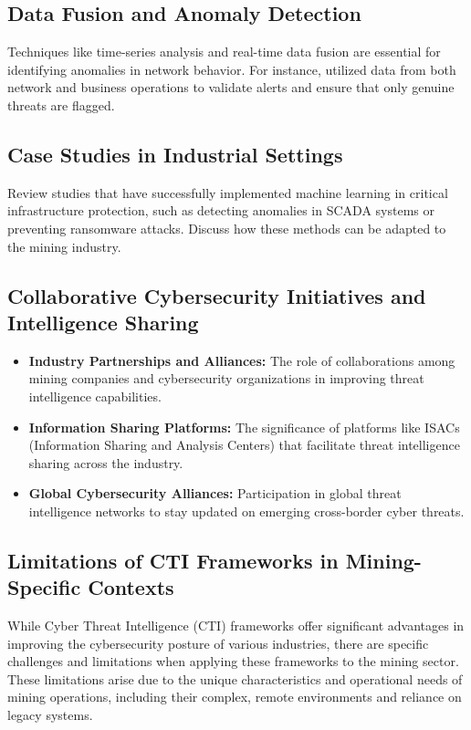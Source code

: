 \documentclass[a4paper,twoside,12pt]{report}
\begin{document}
\subsection*{Data Fusion and Anomaly Detection}
Techniques like time-series analysis and real-time data fusion \citet{song2022time} are essential for identifying anomalies in network behavior. For instance, \citet{islam2022smartvalidator} utilized data from both network and business operations to validate alerts and ensure that only genuine threats are flagged.

\subsection*{Case Studies in Industrial Settings}
Review studies that have successfully implemented machine learning in critical infrastructure protection, such as detecting anomalies in SCADA systems or preventing ransomware attacks. Discuss how these methods can be adapted to the mining industry.

\subsection*{Collaborative Cybersecurity Initiatives and Intelligence Sharing}
\begin{itemize}
    \item \textbf{Industry Partnerships and Alliances:} The role of collaborations among mining companies and cybersecurity organizations in improving threat intelligence capabilities.
    \item \textbf{Information Sharing Platforms:} The significance of platforms like ISACs (Information Sharing and Analysis Centers) that facilitate threat intelligence sharing across the industry.
    \item \textbf{Global Cybersecurity Alliances:} Participation in global threat intelligence networks to stay updated on emerging cross-border cyber threats.
\end{itemize}

\subsection{Limitations of CTI Frameworks in Mining-Specific Contexts}

While Cyber Threat Intelligence (CTI) frameworks offer significant advantages in improving the cybersecurity posture of various industries, there are specific challenges and limitations when applying these frameworks to the mining sector. These limitations arise due to the unique characteristics and operational needs of mining operations, including their complex, remote environments and reliance on legacy systems. 
\end{document}
